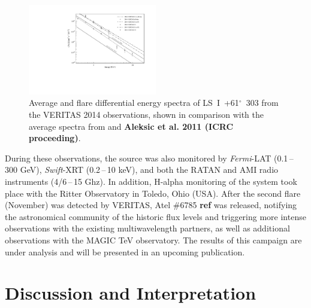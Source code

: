 \documentclass[preprint2]{aastex}
\newcommand{\lsi}{LS~I~+61$^{\circ}$~303}
\begin{document}
\begin{figure}[ht]
\centering
\includegraphics[width=0.5\textwidth]{figs/all_spectra_ED.pdf}
\caption{Average and flare differential energy spectra of \lsi{} from the VERITAS 2014 observations, shown in comparison with the average spectra from \citet{VERITASLSIDetection} and \textbf{Aleksic et al. 2011 (ICRC proceeding)}.}
\label{spec}
\end{figure}

During these observations, the source was also monitored by \emph{Fermi}-LAT (0.1\,--\,300 GeV), \emph{Swift}-XRT (0.2\,--\,10 keV), and both the RATAN and AMI radio instruments (4/6\,--\,15 Ghz). In addition, H-alpha monitoring of the system took place with the Ritter Observatory in Toledo, Ohio (USA). After the second flare (November) was detected by VERITAS, Atel $\#$6785 \textbf{ref} was released, notifying the astronomical community of the historic flux levels and triggering more intense observations with the existing multiwavelength partners, as well as additional observations with the MAGIC TeV observatory. The results of this campaign are under analysis and will be presented in an upcoming publication. 

\section{Discussion and Interpretation}
\end{document}
